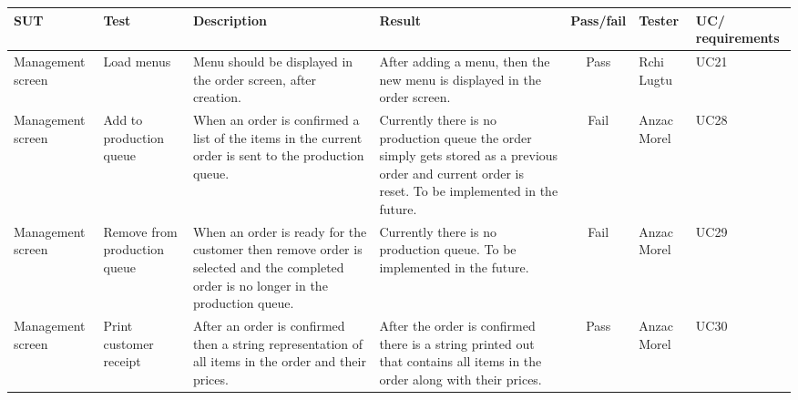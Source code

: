 \begin{tabularx}{\linewidth}{|X|X|X|X|c|X|X|}
\hline
SUT & Test & Description & Result & Pass/fail & Tester & UC/ requirements \\
\hline
Management screen & Load menus & Menu should be displayed in the order screen, after creation. & After adding a menu, then the new menu is displayed in the order screen. & Pass & Rchi Lugtu & UC21 \\
\hline
Management screen & Add to production queue & When an order is confirmed a list of the items in the current order is sent to the production queue. & Currently there is no production queue the order simply gets stored as a previous order and current order is reset. To be implemented in the future. & Fail & Anzac Morel & UC28 \\
\hline
Management screen & Remove from production queue & When an order is ready for the customer then remove order is selected and the completed order is no longer in the production queue. & Currently there is no production queue. To be implemented in the future. & Fail & Anzac Morel & UC29 \\
\hline
Management screen & Print customer receipt & After an order is confirmed then a string representation of all items in the order and their prices. & After the order is confirmed there is a string printed out that contains all items in the order along with their prices. & Pass & Anzac Morel & UC30 \\
\hline
\end{tabularx}